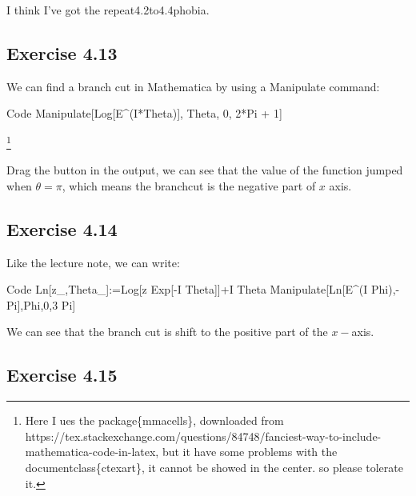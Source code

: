 \documentclass[]{ctexart}
\begin{document}
			I think I've got the repeat4.2to4.4phobia. 
			
	\subsection{Exercise 4.13}
		We can find a branch cut in Mathematica by using a Manipulate command:
\begin{mmaCell}{Code}
  Manipulate[Log[E^(I*Theta)], {Theta, 0, 2*Pi + 1}]
\end{mmaCell}

		\footnote{Here I ues the package\{mmacells\}, downloaded from https://tex.stackexchange.com/questions/84748/fanciest-way-to-include-mathematica-code-in-latex, but it have some problems with the documentclass\{ctexart\}, it cannot be showed in the center. so please tolerate it. }

		Drag the button in the output, we can see that the value of the function jumped when $\theta=\pi $, which means the branchcut is the negative part of $x$ axis. 
	
	\subsection{Exercise 4.14}
		Like the lecture note, we can write:
\begin{mmaCell}{Code}
  Ln[z_,Theta_]:=Log[z Exp[-I Theta]]+I Theta
  Manipulate[Ln[E^(I Phi),-Pi],{Phi,0,3 Pi}]
\end{mmaCell}

		We can see that the branch cut is shift to the positive part of the $x-$axis. 
	
	\subsection{Exercise 4.15}
\end{document}
